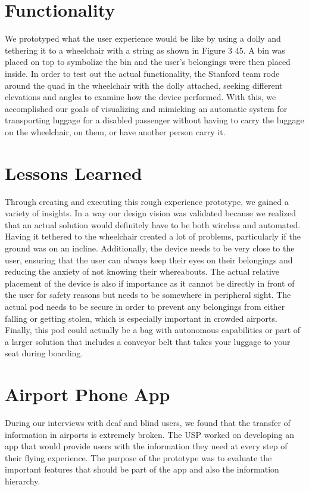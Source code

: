 \section*{Functionality}
We prototyped what the user experience would be like by using a dolly and tethering it to a wheelchair with a string as shown in Figure 3 45. A bin was placed on top to symbolize the bin and the user’s belongings were then placed inside. In order to test out the actual functionality, the Stanford team rode around the quad in the wheelchair with the dolly attached, seeking different elevations and angles to examine how the device performed. With this, we accomplished our goals of visualizing and mimicking an automatic system for transporting luggage for a disabled passenger without having to carry the luggage on the wheelchair, on them, or have another person carry it. 

\section*{Lessons Learned}
Through creating and executing this rough experience prototype, we gained a variety of insights.  In a way our design vision was validated because we realized that an actual solution would definitely have to be both wireless and automated. Having it tethered to the wheelchair created a lot of problems, particularly if the ground was on an incline. Additionally, the device needs to be very close to the user, ensuring that the user can always keep their eyes on their belongings and reducing the anxiety of not knowing their whereabouts. The actual relative placement of the device is also if importance as it cannot be directly in front of the user for safety reasons but needs to be somewhere in peripheral sight. The actual pod needs to be secure in order to prevent any belongings from either falling or getting stolen, which is especially important in crowded airports. Finally, this pod could actually be a bag with autonomous capabilities or part of a larger solution that includes a conveyor belt that takes your luggage to your seat during boarding.  

\section{Airport Phone App}
During our interviews with deaf and blind users, we found that the transfer of information in airports is extremely broken. The USP worked on developing an app that would provide users with the information they need at every step of their flying experience. The purpose of the prototype was to evaluate the important features that should be part of the app and also the information hierarchy.

